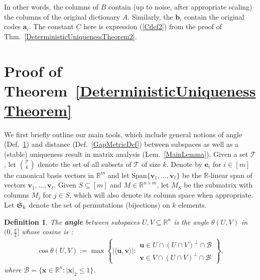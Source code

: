 \documentclass[journal, twocolumn]{IEEEtran}
\newtheorem{definition}{Definition}
\begin{document}
In other words, the columns of $B$ contain (up to noise, after appropriate scaling) the columns of the original dictionary $A$. Similarly, the $\mathbf{b}_i$ contain the original codes $\mathbf{a}_i$. The constant $C$ here is expression (\ref{Cdef2}) from the proof of Thm.~\ref{DeterministicUniquenessTheorem2}. 


\vspace{-.08 cm}

\section{Proof of Theorem~\ref{DeterministicUniquenessTheorem}}\label{DUT}
We first briefly outline our main tools, which include general notions of angle (Def.~\ref{FriedrichsDefinition}) and distance (Def.~\ref{GapMetricDef}) between subspaces as well as a (stable) uniqueness result in matrix analysis (Lem.~\ref{MainLemma}).
Given a set $\mathcal{T}$, let ${\mathcal{T} \choose k}$ denote the set of all subsets of $\mathcal{T}$ of size $k$. Denote by $\mathbf{e}_i$ for $i \in [m]$ the canonical basis vectors in $\mathbb{R}^m$ and let $\text{Span}\{\mathbf{v}_1, \ldots, \mathbf{v}_\ell\}$ be the $\mathbb{R}$-linear span of vectors $\mathbf{v}_1, \ldots, \mathbf{v}_\ell$. Given $S \subseteq [m]$ and $M \in \mathbb{R}^{n \times m}$, let $M_S$ be the submatrix with columns $M_j$ for $j \in S$, which will also denote its column space when appropriate. Let $\frak{S}_{k}$ denote the set of permutations (bijections) on $k$ elements.

\begin{definition}\label{FriedrichsDefinition}
The \textbf{angle} between subspaces $U,V \subseteq \mathbb{R}^n$ is the angle $\theta(U,V)$ in $(0,\frac{\pi}{2}]$ whose cosine is \cite[Def.~9.4]{Deutsch12}:
\begin{align*}
\cos{\theta(U,V)} := \max\left\{ |\langle \mathbf{u}, \mathbf{v} \rangle|: \substack{ \mathbf{u} \in U \cap (U \cap V)^\perp \cap \mathcal{B} \\ \mathbf{v} \in V \cap (U \cap V)^\perp \cap \mathcal{B} } \right\},
\end{align*}
where $\mathcal{B} = \{ \mathbf{x} \in \mathbb{R}^n: |\mathbf{x}|_2 \leq 1\}$.
\end{definition}
\end{document}
